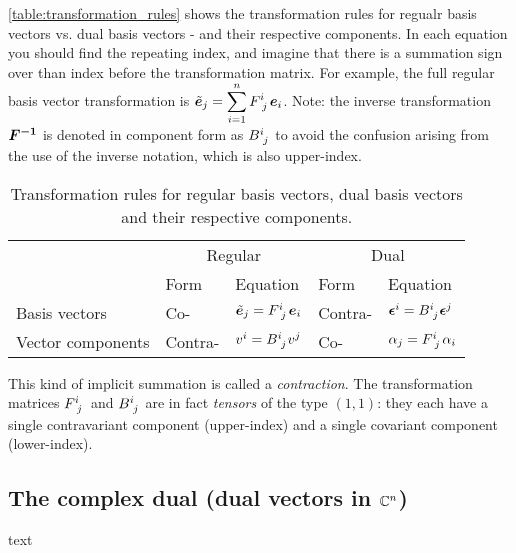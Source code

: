 \autoref{table:transformation_rules} shows the transformation rules for regualr basis vectors vs. dual basis vectors - and their respective components. In each equation you should find the repeating index, and imagine that there is a summation sign over than index before the transformation matrix. For example, the full regular basis vector transformation is $\ebc{j}=\displaystyle\sum_{i=1}^{n}\Forwcomps\eb{i}$. Note: the inverse transformation $\Backw$ is denoted in component form as $\Backwcomps$ to avoid the confusion arising from the use of the inverse notation, which is also upper-index.

\begin{table}
    \caption{Transformation rules for regular basis vectors, dual basis vectors and their respective components.}\label{table:transformation_rules}
    \begin{center}
        \begin{tabular}[c]{l|ll|ll}
            \toprule
              & \multicolumn{2}{c|}{Regular} & \multicolumn{2}{c}{Dual} \\
              & Form & Equation & Form & Equation \\
            \midrule
            Basis vectors & Co- & $\ebc{j}=\Forwcomps\eb{i}$ & Contra- & $\dualeb{i}=\Backwcomps\dualeb{j}$ \\
            Vector components & Contra- & $v^{i}=\Backwcomps v^{j}$ & Co-  & $\alpha_{j}=\Forwcomps \alpha_{i}$ \\
            \bottomrule
        \end{tabular}
    \end{center}
\end{table}
This kind of implicit summation is called a \textit{contraction}. The transformation matrices $\Forwcomps$ and $\Backwcomps$ are in fact \textit{tensors} of the type $(1,1)$: they each have a single contravariant component (upper-index) and a single covariant component (lower-index).

\subsection{The complex dual (dual vectors in $\Cs[n]$)}
text

